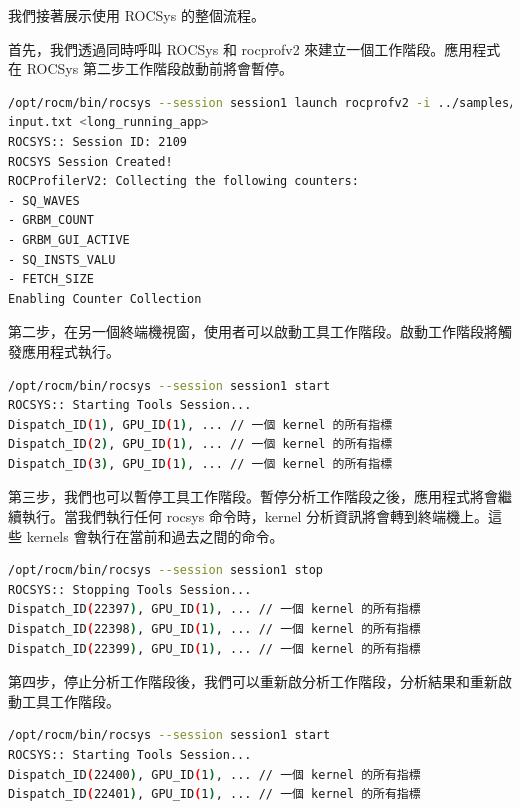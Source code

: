 我們接著展示使用 ROCSys 的整個流程。

首先，我們透過同時呼叫 ROCSys 和 rocprofv2 來建立一個工作階段。應用程式在 ROCSys 第二步工作階段啟動前將會暫停。

\begin{lstlisting}[language=bash, caption={使用 ROCSys 和 rocprofv2 建立工作階段}, label={lst:Creating a session using ROCSys and rocprofv2}]
/opt/rocm/bin/rocsys --session session1 launch rocprofv2 -i ../samples/
input.txt <long_running_app>
ROCSYS:: Session ID: 2109
ROCSYS Session Created!
ROCProfilerV2: Collecting the following counters:
- SQ_WAVES
- GRBM_COUNT
- GRBM_GUI_ACTIVE
- SQ_INSTS_VALU
- FETCH_SIZE
Enabling Counter Collection
\end{lstlisting}

第二步，在另一個終端機視窗，使用者可以啟動工具工作階段。啟動工作階段將觸發應用程式執行。

\begin{lstlisting}[language=bash, caption={開始分析工作階段}, label={lst:Starting the profiling session}]
/opt/rocm/bin/rocsys --session session1 start
ROCSYS:: Starting Tools Session...
Dispatch_ID(1), GPU_ID(1), ... // 一個 kernel 的所有指標
Dispatch_ID(2), GPU_ID(1), ... // 一個 kernel 的所有指標
Dispatch_ID(3), GPU_ID(1), ... // 一個 kernel 的所有指標
\end{lstlisting}

第三步，我們也可以暫停工具工作階段。暫停分析工作階段之後，應用程式將會繼續執行。當我們執行任何 rocsys 命令時，kernel 分析資訊將會轉到終端機上。這些 kernels 會執行在當前和過去之間的命令。

\begin{lstlisting}[language=bash, caption={停止分析工作階段}, label={lst:Stopping the profiling session}]
/opt/rocm/bin/rocsys --session session1 stop
ROCSYS:: Stopping Tools Session...
Dispatch_ID(22397), GPU_ID(1), ... // 一個 kernel 的所有指標
Dispatch_ID(22398), GPU_ID(1), ... // 一個 kernel 的所有指標
Dispatch_ID(22399), GPU_ID(1), ... // 一個 kernel 的所有指標
\end{lstlisting}

第四步，停止分析工作階段後，我們可以重新啟分析工作階段，分析結果和重新啟動工具工作階段。

\begin{lstlisting}[language=bash, caption={重啟分析工作階段}, label={lst:Restarting the profiling session}]
/opt/rocm/bin/rocsys --session session1 start
ROCSYS:: Starting Tools Session...
Dispatch_ID(22400), GPU_ID(1), ... // 一個 kernel 的所有指標
Dispatch_ID(22401), GPU_ID(1), ... // 一個 kernel 的所有指標
\end{lstlisting}


